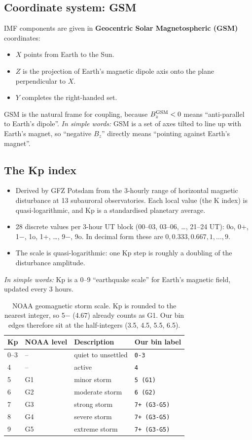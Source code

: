 \documentclass[11pt,a4paper]{article}
\newcommand{\code}[1]{\texttt{#1}}
\newcommand{\easy}[1]{\textit{In simple words:} #1}
\begin{document}
\subsection{Coordinate system: GSM}
IMF components are given in \textbf{Geocentric Solar Magnetospheric (GSM)} coordinates:
\begin{itemize}
\item $X$ points from Earth to the Sun.
\item $Z$ is the projection of Earth's magnetic dipole axis onto the plane perpendicular to $X$.
\item $Y$ completes the right-handed set.
\end{itemize}
GSM is the natural frame for coupling, because $B_z^{\rm GSM}<0$ means ``anti-parallel to Earth's dipole''.
\easy{GSM is a set of axes tilted to line up with Earth's magnet, so ``negative $B_z$'' directly means
``pointing against Earth's magnet''.}

\subsection{The Kp index}
\begin{itemize}
\item Derived by GFZ Potsdam from the 3-hourly range of horizontal magnetic disturbance at 13 subauroral
observatories. Each local value (the K index) is quasi-logarithmic, and Kp is a standardised planetary average.
\item 28 discrete values per 3-hour UT block (00--03, 03--06, \dots, 21--24 UT):
0o, 0+, 1$-$, 1o, 1+, \dots, 9$-$, 9o. In decimal form these are $0, 0.333, 0.667, 1, \dots, 9$.
\item The scale is quasi-logarithmic: one Kp step is roughly a doubling of the disturbance amplitude.
\end{itemize}
\easy{Kp is a 0--9 ``earthquake scale'' for Earth's magnetic field, updated every 3 hours.}

\begin{table}[H]\centering\small
\caption{NOAA geomagnetic storm scale. Kp is rounded to the nearest integer, so 5$-$ (4.67) already counts as G1.
Our bin edges therefore sit at the half-integers (3.5, 4.5, 5.5, 6.5).}
\begin{tabular}{llll}\toprule
Kp & NOAA level & Description & Our bin label\\\midrule
0--3 & -- & quiet to unsettled & \code{0-3}\\
4 & -- & active & \code{4}\\
5 & G1 & minor storm & \code{5 (G1)}\\
6 & G2 & moderate storm & \code{6 (G2)}\\
7 & G3 & strong storm & \code{7+ (G3-G5)}\\
8 & G4 & severe storm & \code{7+ (G3-G5)}\\
9 & G5 & extreme storm & \code{7+ (G3-G5)}\\\bottomrule
\end{tabular}\end{table}
\end{document}
